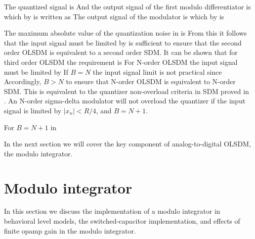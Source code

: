 The quantized signal is 
And the output signal of the first modulo differentiator is
which by  is written as
The output signal of the modulator is
which by  is

The maximum absolute
value of the quantization noise in 
 is 
From this it follows that the input signal must be limited by
 is sufficient to ensure that the second order
OLSDM is equivalent to a second order SDM. It can be shown that for third
order OLSDM the requirement is  
For N-order OLSDM the input signal must be limited by
If $B=N$ the input signal limit is not practical since
Accordingly, $B > N$ to ensure that N-order OLSDM is equivalent to
N-order SDM. This is equivalent to the quantizer 
non-overload criteria in SDM proved in
\cite{lokken06}. An N-order sigma-delta modulator will not overload
the quantizer if the input signal is limited by
$|x_n| < R/4$, and $B=N+1$. 

For $B=N+1$ in 

In the next section we will cover the key component of
analog-to-digital OLSDM, the modulo integrator.



\section{Modulo integrator}\label{sdrmodulointegrators}

In this section we discuss the implementation of a
modulo integrator in behavioral level models, the switched-capacitor
implementation, and effects of finite opamp gain in the modulo integrator. 

